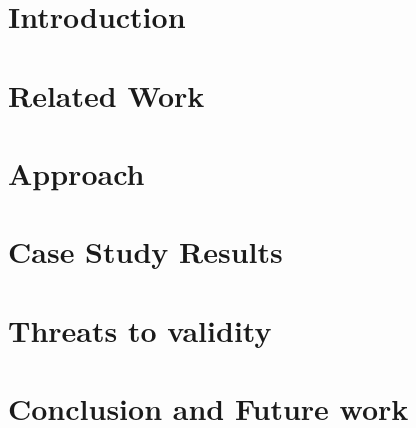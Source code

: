 \documentclass[conference]{IEEEtran}
\begin{document}
\IEEEpeerreviewmaketitle

\section{Introduction}
\label{sec:introduction}


\section{Related Work}
\label{sec:related_work}


\section{Approach}
\label{sec:approach}


\section{Case Study Results}
\label{sec:results}


\section{Threats to validity}
\label{sec:threats_to_validity}


\section{Conclusion and Future work}
\label{sec:conclusion}






% 
\end{document}
